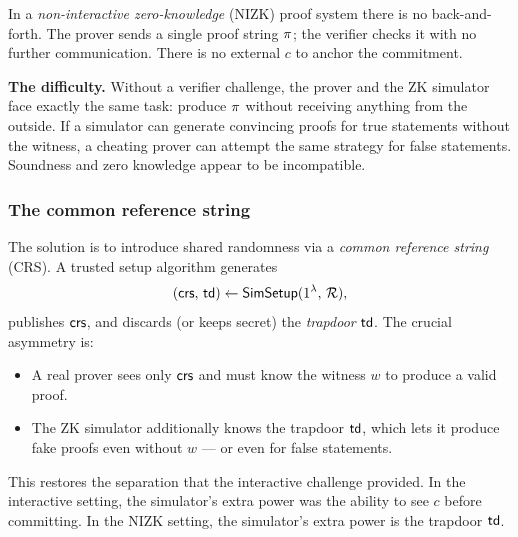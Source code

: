 In a \emph{non-interactive zero-knowledge} (NIZK) proof system there is no back-and-forth. The prover sends a single proof string $\pi$; the verifier checks it with no further communication. There is no external $c$ to anchor the commitment.

\begin{tcolorbox}[colback=red!5!white,colframe=red!55!black,boxrule=0.6pt,arc=2mm]
\textbf{The difficulty.} Without a verifier challenge, the prover and the ZK simulator face exactly the same task: produce $\pi$ without receiving anything from the outside. If a simulator can generate convincing proofs for true statements without the witness, a cheating prover can attempt the same strategy for false statements. Soundness and zero knowledge appear to be incompatible.
\end{tcolorbox}

\subsubsection{The common reference string}

The solution is to introduce shared randomness via a \emph{common reference string} (CRS). A trusted setup algorithm generates
\[
  (\mathsf{crs},\, \mathsf{td}) \leftarrow \mathsf{SimSetup}(1^\lambda,\, \mathcal{R}),
\]
publishes $\mathsf{crs}$, and discards (or keeps secret) the \emph{trapdoor} $\mathsf{td}$. The crucial asymmetry is:

\begin{itemize}[leftmargin=2em]
  \item A real prover sees only $\mathsf{crs}$ and must know the witness $w$ to produce a valid proof.
  \item The ZK simulator additionally knows the trapdoor $\mathsf{td}$, which lets it produce fake proofs even without $w$ --- or even for false statements.
\end{itemize}

This restores the separation that the interactive challenge provided. In the interactive setting, the simulator's extra power was the ability to see $c$ before committing. In the NIZK setting, the simulator's extra power is the trapdoor $\mathsf{td}$.
